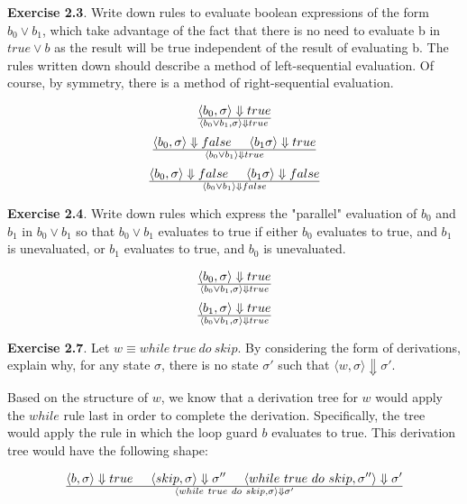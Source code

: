 \documentclass{article}
\begin{document}
\noindent \textbf{Exercise 2.3}. Write down rules to evaluate boolean expressions of the form $b_0 \lor b_1$, which take advantage of the fact that there is no need to evaluate b in $true \lor b$ as the result will be true independent of the result of evaluating b. The rules written down should describe a method of left-sequential evaluation. Of course, by symmetry, there is a method of right-sequential evaluation.

$$
\langle b_0, \sigma \rangle \Downarrow true \over \langle b_0 \lor b_1, \sigma \rangle \Downarrow true \\
$$
$$
\langle b_0, \sigma \rangle \Downarrow false \hspace{5mm} \langle b_ 1 \sigma \rangle \Downarrow true \over
\langle b_0 \lor b_1 \rangle \Downarrow true
$$
$$
\langle b_0, \sigma \rangle \Downarrow false \hspace{5mm} \langle b_ 1 \sigma \rangle \Downarrow false \over
\langle b_0 \lor b_1 \rangle \Downarrow false
$$

\noindent \textbf{Exercise 2.4}. Write down rules which express the "parallel" evaluation of $b_0$ and $b_1$ in $b_0 \lor b_1$ so that $b_0 \lor b_1$ evaluates to true if either $b_0$ evaluates to true, and $b_1$ is unevaluated, or $b_1$ evaluates to true, and $b_0$ is unevaluated.

$$
\langle b_0, \sigma \rangle \Downarrow true \over \langle b_0 \lor b_1, \sigma \rangle \Downarrow true
$$
$$
\langle b_1, \sigma \rangle \Downarrow true \over \langle b_0 \lor b_1, \sigma \rangle \Downarrow true
$$

\noindent \textbf{Exercise 2.7}. Let $w \equiv while~true~do~skip$. By considering the form of derivations,
explain why, for any state $\sigma$, there is no state $\sigma'$ such that $\langle w, \sigma \rangle \Downarrow \sigma'$.

\bigskip
\noindent Based on the structure of $w$, we know that a derivation tree for $w$ would apply the $while$ rule last in order to complete the derivation. Specifically, the tree would apply the rule in which the loop guard $b$ evaluates to true. This derivation tree would have the following shape:

$$
\langle b, \sigma \rangle \Downarrow true \hspace{5mm} \langle skip, \sigma \rangle \Downarrow \sigma'' \hspace{5mm} \langle while~true~do~skip, \sigma'' \rangle \Downarrow \sigma' \over \langle while~true~do~skip, \sigma \rangle \Downarrow \sigma'
$$
\end{document}
